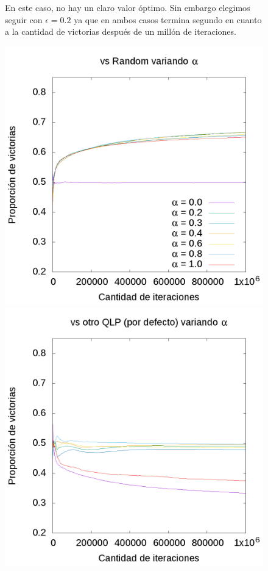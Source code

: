 \documentclass[10pt, a4paper]{article}
\begin{document}
\begin{figure}[H]
\begin{minipage}[c]{1\textwidth}
	\caption{En este caso, no  hay un claro valor óptimo. Sin embargo elegimos seguir con $\epsilon=0.2$ ya que en ambos casos termina segundo en cuanto a la cantidad de victorias después de un millón de iteraciones.}
  \end{minipage}
\end{figure}
\begin{figure}[H]
  \begin{minipage}[c]{1\textwidth}
	\includegraphics[scale=0.25]{AlphaR.png}
	\includegraphics[scale=0.25]{AlphaQ.png}

\end{minipage}
\end{figure}
\end{document}
